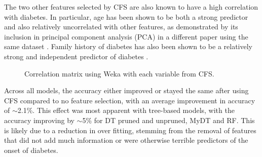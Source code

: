 The two other features selected by CFS are also known to have a high correlation with diabetes. In particular, age has been shown to be both a strong predictor \cite{i} and also relatively uncorrelated with other features, as demonstrated by its inclusion in principal component analysis (PCA) in a different paper using the same dataset \cite{c}. Family history of diabetes has also been shown to be a relatively strong and independent predictor of diabetes \cite{j}. \\

\begin{figure}[htp] 
\caption{Correlation matrix using Weka with each variable from CFS.\label{fig:corr}}
\end{figure}


Across all models, the accuracy either improved or stayed the same after using CFS compared to no feature selection, with an average improvement in accuracy of $\sim$2.1\%. This effect was most apparent with tree-based models, with the accuracy improving by $\sim$5\% for DT pruned and unpruned, MyDT and RF. This is likely due to a reduction in over fitting, stemming from the removal of features that did not add much information or were otherwise terrible predictors of the onset of diabetes.

